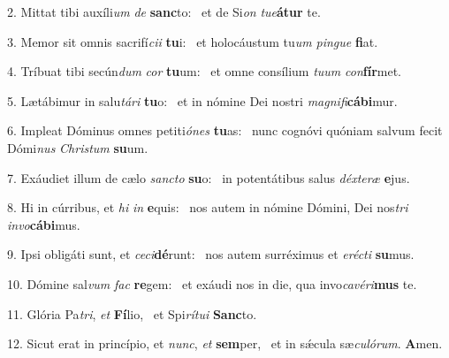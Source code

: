 2. Mittat tibi auxíli\textit{um} \textit{de} \textbf{sanc}to: \ast\  et de Si\textit{on} \textit{tu}\textit{e}\textbf{á}\textbf{tur} te.\

3. Memor sit omnis sacrifí\textit{ci}\textit{i} \textbf{tu}i: \ast\  et holocáustum tu\textit{um} \textit{pin}\textit{gue} \textbf{fi}at.\

4. Tríbuat tibi secún\textit{dum} \textit{cor} \textbf{tu}um: \ast\  et omne consílium \textit{tu}\textit{um} \textit{con}\textbf{fír}met.\

5. Lætábimur in salu\textit{tá}\textit{ri} \textbf{tu}o: \ast\  et in nómine Dei nostri \textit{ma}\textit{gni}\textit{fi}\textbf{cá}\textbf{bi}mur.\

6. Impleat Dóminus omnes petiti\textit{ó}\textit{nes} \textbf{tu}as: \ast\  nunc cognóvi quóniam salvum fecit Dómi\textit{nus} \textit{Chris}\textit{tum} \textbf{su}um.\

7. Exáudiet illum de cælo \textit{sanc}\textit{to} \textbf{su}o: \ast\  in potentátibus salus \textit{déx}\textit{te}\textit{ræ} \textbf{e}jus.\

8. Hi in cúrribus, et \textit{hi} \textit{in} \textbf{e}quis: \ast\  nos autem in nómine Dómini, Dei nos\textit{tri} \textit{in}\textit{vo}\textbf{cá}\textbf{bi}mus.\

9. Ipsi obligáti sunt, et \textit{ce}\textit{ci}\textbf{dé}runt: \ast\  nos autem surréximus et \textit{e}\textit{réc}\textit{ti} \textbf{su}mus.\

10. Dómine sal\textit{vum} \textit{fac} \textbf{re}gem: \ast\  et exáudi nos in die, qua invo\textit{ca}\textit{vé}\textit{ri}\textbf{mus} te.\

11. Glória Pa\textit{tri}, \textit{et} \textbf{Fí}lio, \ast\  et Spi\textit{rí}\textit{tu}\textit{i} \textbf{Sanc}to.\

12. Sicut erat in princípio, et \textit{nunc}, \textit{et} \textbf{sem}per, \ast\  et in sǽcula sæ\textit{cu}\textit{ló}\textit{rum}. \textbf{A}men.\

